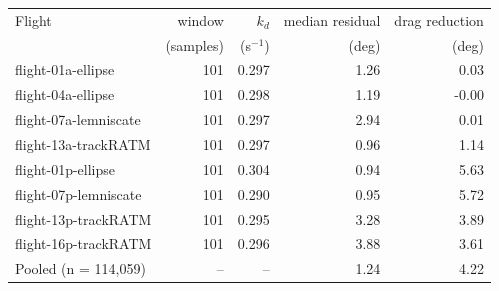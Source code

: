 \footnotesize
\begin{tabular}{lrrrr}
\toprule
Flight & window & $k_d$ & median residual & drag reduction \\
 & (samples) & (s$^{-1}$) & (deg) & (deg) \\
\midrule
flight-01a-ellipse & 101 & 0.297 & 1.26 & 0.03 \\
flight-04a-ellipse & 101 & 0.298 & 1.19 & -0.00 \\
flight-07a-lemniscate & 101 & 0.297 & 2.94 & 0.01 \\
flight-13a-trackRATM & 101 & 0.297 & 0.96 & 1.14 \\
flight-01p-ellipse & 101 & 0.304 & 0.94 & 5.63 \\
flight-07p-lemniscate & 101 & 0.290 & 0.95 & 5.72 \\
flight-13p-trackRATM & 101 & 0.295 & 3.28 & 3.89 \\
flight-16p-trackRATM & 101 & 0.296 & 3.88 & 3.61 \\
\midrule
Pooled (n = 114,059) & -- & -- & 1.24 & 4.22 \\
\bottomrule
\end{tabular}
